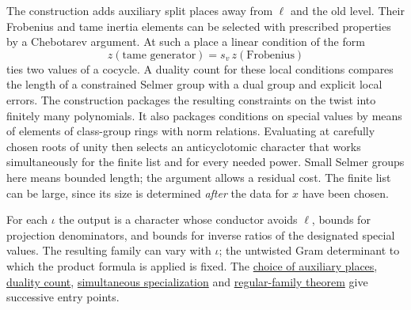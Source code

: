 \documentclass[11pt,letterpaper]{article}
\newcommand{\sref}[2]{\href{https://github.com/VladimirReshetnikov/ProveIt/blob/d8415e76ad850651f8c0083afe689dd9f4a45a10/Analysis/GeneralizedRiemannHypothesis/vendor/grh-lean/grh/src/#1.lean}{#2}}
\begin{document}
The construction adds auxiliary split places away from \(\ell\) and the old level. Their Frobenius and tame inertia elements can be selected with prescribed properties by a Chebotarev argument. At such a place a linear condition of the form
\[
         z(\text{tame generator})
                 =s_v\,z(\text{Frobenius})
\]
ties two values of a cocycle. A duality count for these local conditions compares the length of a constrained Selmer group with a dual group and explicit local errors. The construction packages the resulting constraints on the twist into finitely many polynomials. It also packages conditions on special values by means of elements of class-group rings with norm relations. Evaluating at carefully chosen roots of unity then selects an anticyclotomic character that works simultaneously for the finite list and for every needed power. Small Selmer groups here means bounded length; the argument allows a residual cost. The finite list can be large, since its size is determined \emph{after} the data for \(x\) have been chosen.

For each \(\iota\) the output is a character whose conductor avoids \(\ell\), bounds for projection denominators, and bounds for inverse ratios of the designated special values. The resulting family can vary with \(\iota\); the untwisted Gram determinant to which the product formula is applied is fixed. The \sref{New/Congruences/Selmer/AuxiliaryPrimes}{choice of auxiliary places}, \sref{New/Congruences/Selmer/Count}{duality count}, \sref{New/Congruences/Selmer/GeneralTheorem}{simultaneous specialization} and \sref{New/Congruences/FitTwistsExist}{regular-family theorem} give successive entry points.
\end{document}

